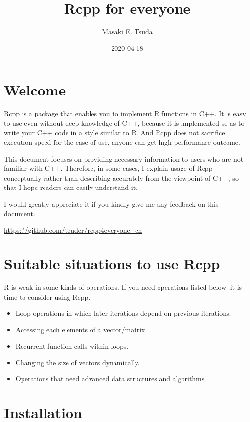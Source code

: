 \documentclass[]{book}
\title{Rcpp for everyone}
\author{Masaki E. Tsuda}
\date{2020-04-18}
\providecommand{\tightlist}{%
  \setlength{\itemsep}{0pt}\setlength{\parskip}{0pt}}
\begin{document}
\maketitle

{
\setcounter{tocdepth}{1}
\tableofcontents
}
\hypertarget{welcome}{%
\chapter*{Welcome}\label{welcome}}

Rcpp is a package that enables you to implement R functions in C++. It is easy to use even without deep knowledge of C++, because it is implemented so as to write your C++ code in a style similar to R. And Rcpp does not sacrifice execution speed for the ease of use, anyone can get high performance outcome.

This document focuses on providing necessary information to users who are not familiar with C++. Therefore, in some cases, I explain usage of Rcpp conceptually rather than describing accurately from the viewpoint of C++, so that I hope readers can easily understand it.

I would greatly appreciate it if you kindly give me any feedback on this document.

\url{https://github.com/teuder/rcpp4everyone_en}

\hypertarget{suitable-situations-to-use-rcpp}{%
\chapter{Suitable situations to use Rcpp}\label{suitable-situations-to-use-rcpp}}

R is weak in some kinds of operations. If you need operations listed below, it is time to consider using Rcpp.

\begin{itemize}
\tightlist
\item
  Loop operations in which later iterations depend on previous iterations.
\item
  Accessing each elements of a vector/matrix.
\item
  Recurrent function calls within loops.
\item
  Changing the size of vectors dynamically.
\item
  Operations that need advanced data structures and algorithms.
\end{itemize}

\hypertarget{installation}{%
\chapter{Installation}\label{installation}}
\end{document}
